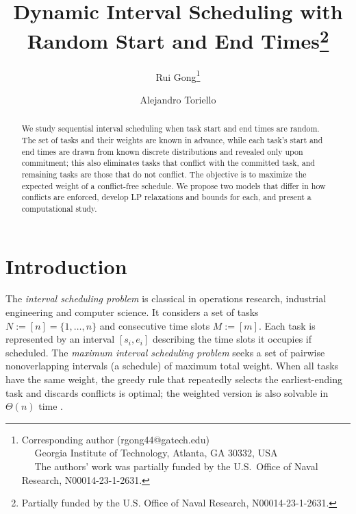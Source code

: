 \documentclass{article}
\title{Dynamic Interval Scheduling with Random Start and End Times\thanks{Partially funded by the U.S. Office of Naval Research, N00014-23-1-2631.}} %
\author{Rui Gong\thanks{
Corresponding author (rgong44@gatech.edu)\\
\indent~~ Georgia Institute of Technology, Atlanta, GA 30332, USA\\
\indent~~ The authors' work was partially funded by the U.S.\ Office of Naval Research, N00014-23-1-2631.} \and 
Alejandro Toriello}
\begin{document}
\maketitle
\begin{abstract}
We study sequential interval scheduling when task start and end times are random.
The set of tasks and their weights are known in advance, while each task's start and end times are drawn from known discrete distributions and revealed only upon commitment;
this also eliminates tasks that conflict with the committed task, and remaining tasks are those that do not conflict. 
The objective is to maximize the expected weight of a conflict-free schedule.
We propose two models that differ in how conflicts are enforced, develop LP relaxations and bounds for each, and present a computational study.
\end{abstract}

\section{Introduction}
The \emph{interval scheduling problem} is classical in operations research, industrial engineering and computer science.
It considers a set of tasks $N:=[n] = \{1, \dotsc, n\}$ and consecutive time slots $M:=[m]$.
Each task is represented by an interval $[s_i,e_i]$ describing the time slots it occupies if scheduled.
The \emph{maximum interval scheduling problem} seeks a set of pairwise nonoverlapping intervals (a schedule) of maximum total weight.
When all tasks have the same weight, the greedy rule that repeatedly selects the earliest-ending task and discards conflicts is optimal;
the weighted version is also solvable in $\Theta(n)$ time \cite{Kleinberg+Tardos:06a}.
\end{document}
